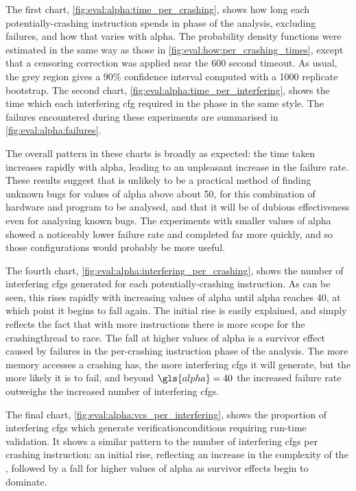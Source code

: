 The first chart, \autoref{fig:eval:alpha:time_per_crashing}, shows how
long each potentially-crashing instruction spends in phase \subcrash{}
of the analysis, excluding failures, and how that varies with
\gls{alpha}.  The probability density functions were estimated in the
same way as those in \autoref{fig:eval:how:per_crashing_times}, except
that a censoring correction was applied near the 600 second timeout.
As usual, the grey region gives a 90\% confidence interval computed
with a 1000 replicate bootstrap.  The second chart,
\autoref{fig:eval:alpha:time_per_interfering}, shows the time which
each interfering \gls{cfg} required in the \subinterfering{} phase in
the same style.  The failures encountered during these experiments are
summarised in \autoref{fig:eval:alpha:failures}.

The overall pattern in these charts is broadly as expected: the time
taken increases rapidly with \gls{alpha}, leading to an unpleasant
increase in the failure rate.  These results suggest that {\technique}
is unlikely to be a practical method of finding unknown bugs for
values of \gls{alpha} above about 50, for this combination of hardware
and program to be analysed, and that it will be of dubious
effectiveness even for analysing known bugs.  The experiments with
smaller values of \gls{alpha} showed a noticeably lower failure rate
and completed far more quickly, and so those configurations would
probably be more useful.

The fourth chart, \autoref{fig:eval:alpha:interfering_per_crashing},
shows the number of interfering \glspl{cfg} generated for each
potentially-crashing instruction.  As can be seen, this rises rapidly
with increasing values of \gls{alpha} until \gls{alpha} reaches 40, at
which point it begins to fall again.  The initial rise is easily
explained, and simply reflects the fact that with more instructions
there is more scope for the \gls{crashingthread} to race.  The fall at
higher values of \gls{alpha} is a survivor effect caused by failures
in the per-crashing instruction phase of the analysis.  The more
memory accesses a crashing {\StateMachine} has, the more interfering
\glspl{cfg} it will generate, but the more likely it is to fail, and
beyond $\gls{alpha}=40$ the increased failure rate outweighs the
increased number of interfering \glspl{cfg}.

The final chart, \autoref{fig:eval:alpha:vcs_per_interfering}, shows
the proportion of interfering \glspl{cfg} which generate
\glspl{verificationcondition} requiring run-time validation.  It shows
a similar pattern to the number of interfering \glspl{cfg} per
crashing instruction: an initial rise, reflecting an increase in the
complexity of the {\StateMachines}, followed by a fall for higher
values of \gls{alpha} as survivor effects begin to dominate.

